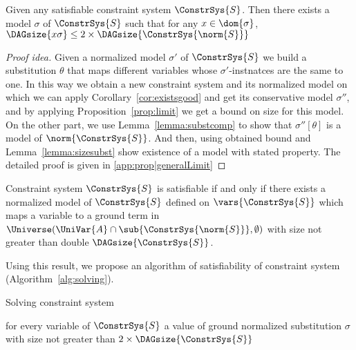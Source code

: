 \begin{prop} \label{prop:generalLimit}
  Given any satisfiable constraint system $\ConstrSys{S}$. Then there exists a model $\sigma$ of $\ConstrSys{S}$ such that for any $x\in\dom{\sigma}$, $\DAGsize{x\sigma}\leq 2\times\DAGsize{\ConstrSys{\norm{S}}}$ \begin{proof}[Proof idea]
Given a normalized model $\sigma'$ of $\ConstrSys{S}$ we build a substitution $\theta$ that maps different variables whose $\sigma'$-instnatces are the same to one.
In this way we obtain a new constraint system and its normalized model on which we can apply Corollary~\ref{cor:existsgood} and get its conservative model $\sigma''$,
and by applying Proposition~\ref{prop:limit} we get a bound on size for this model. 
On the other part, we use Lemma~\ref{lemma:substcomp} to show that $\sigma''[\theta]$ is a model of $\norm{\ConstrSys{S}}$.
And then, using obtained bound and Lemma~\ref{lemma:sizesubst} show existence of a model with stated property.
The detailed proof is given in \ref{app:prop|generalLimit}

\end{proof}

\end{prop}


\begin{cor}\label{cor:polynom}
Constraint system  $\ConstrSys{S}$ is satisfiable if and only if there exists  a normalized model of $\ConstrSys{S}$ defined on $\vars{\ConstrSys{S}}$ 
which maps a variable to a ground term in $\Universe(\UniVar{A}\cap \sub{\ConstrSys{\norm{S}}}, \emptyset)$  with size not greater than double $\DAGsize{\ConstrSys{S}}$.


\end{cor}

Using this result, we propose an algorithm of satisfiability of constraint system (Algorithm~\ref{alg:solving}).


\begin{algorithm}[H]
  \caption{Solving constraint system}
  \label{alg:solving}
  \BlankLine
\Guess for every variable of $\ConstrSys{S}$ a value of ground normalized substitution $\sigma$ with size not greater than $2\times\DAGsize{\ConstrSys{{S}}}$\;
\end{algorithm}






